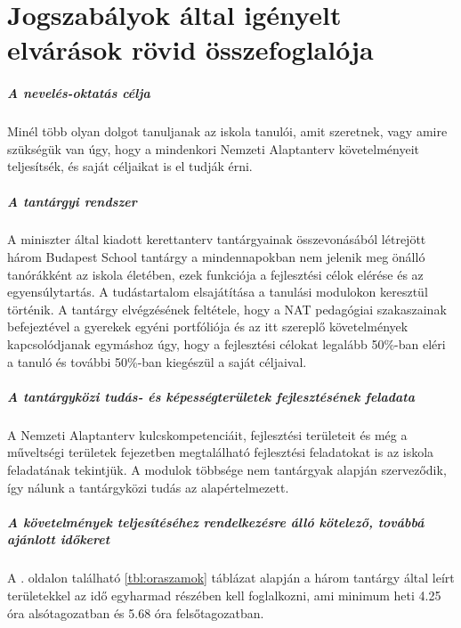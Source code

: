 \chapter{Jogszabályok által igényelt elvárások rövid összefoglalója}
\paragraph{A nevelés-oktatás célja}

Minél több olyan dolgot tanuljanak az iskola tanulói, amit szeretnek, vagy amire szükségük van úgy, hogy a mindenkori Nemzeti Alaptanterv követelményeit teljesítsék, és saját céljaikat is el tudják érni.

\paragraph{A tantárgyi rendszer}

A miniszter által kiadott kerettanterv tantárgyainak összevonásából létrejött három Budapest School tantárgy a mindennapokban nem jelenik meg önálló tanórákként az iskola életében, ezek funkciója a fejlesztési célok elérése és az egyensúlytartás. A tudástartalom elsajátítása a tanulási modulokon keresztül történik. A tantárgy elvégzésének feltétele, hogy a NAT pedagógiai szakaszainak befejeztével a gyerekek egyéni portfóliója és az itt szereplő követelmények kapcsolódjanak egymáshoz úgy, hogy a fejlesztési célokat legalább 50\%-ban eléri a tanuló és további 50\%-ban kiegészül a saját céljaival.

\paragraph{A tantárgyközi tudás- és képességterületek fejlesztésének feladata}

A Nemzeti Alaptanterv kulcskompetenciáit, fejlesztési területeit és még a műveltségi területek fejezetben megtalálható fejlesztési feladatokat is az iskola feladatának tekintjük. A modulok többsége nem tantárgyak alapján szerveződik, így nálunk a tantárgyközi tudás az alapértelmezett.

\paragraph{A követelmények teljesítéséhez rendelkezésre álló kötelező, továbbá ajánlott időkeret}

A \pageref{tbl:oraszamok}. oldalon található \ref{tbl:oraszamok} táblázat alapján a három tantárgy által leírt területekkel az idő egyharmad részében kell foglalkozni, ami minimum heti 4.25 óra alsótagozatban és 5.68 óra felsőtagozatban.

